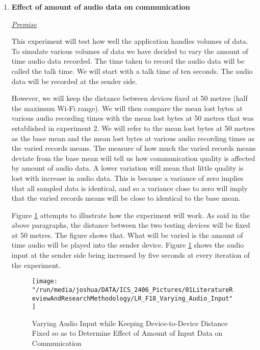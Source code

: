 \documentclass[12pt,svgnames,smaller]{article} %
\begin{document}
\begin{enumerate}
\begin{enumerate}
			
			\item \textbf{Effect of amount of audio data on communication}
			
			\emph{\underline{\textsf{Premise}}}
			
			This experiment will test how well the application handles volumes of data. 
			To simulate various volumes of data we have decided to vary the amount of time audio data recorded. The time taken to record the audio data will be called the talk time. We will start with a talk time of ten seconds. The audio data will be recorded at the sender side. 
			
			However, we will keep the distance between devices fixed at 50 metres (half the maximum Wi-Fi range). We will then compare the mean lost bytes at various audio recording times with the mean lost bytes at 50 metres that was established in experiment 2. We will refer to the mean lost bytes at 50 metres as the base mean and the mean lost bytes at various audio recording times as the varied records means. The measure of how much the varied records means deviate from the base mean will tell us how communication quality is affected by amount of audio data.
			A lower variation will mean that little quality is lost with increase in audio data. This is because a variance of zero implies that all sampled data is identical, and so a variance close to zero will imply that the varied records means will be close to identical to the base mean.
			
			Figure \ref{fig:LiteratureReview-Figure18} attempts to illustrate how the experiment will work. As said in the above paragraphs, the distance between the two testing devices will be fixed at 50 metres. The figure shows that. What will be varied is the amount of time audio will be played into the sender device. Figure \ref{fig:LiteratureReview-Figure18} shows the audio input at the sender side being increased by five seconds at every iteration of the experiment. 
			
			\begin{figure}
				\centering
				\texttt{[image: "/run/media/joshua/DATA/ICS\_2406\_Pictures/01LiteratureReviewAndResearchMethodology/LR\_F18\_Varying\_Audio\_Input"]}
				\caption{Varying Audio Input while Keeping Device-to-Device Distance Fixed so as to Determine Effect of Amount of Input Data on Communication}
				\label{fig:LiteratureReview-Figure18}
			\end{figure}
			

\end{enumerate}
\end{enumerate}
\end{document}
